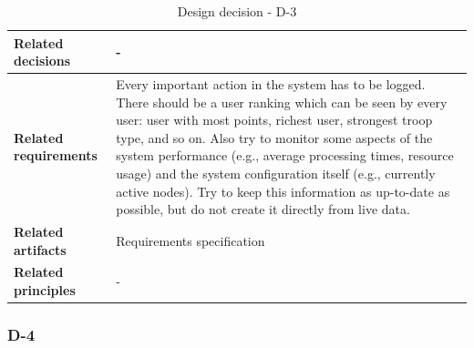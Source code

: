 \documentclass[11pt]{article}
\begin{document}
\begin{table}[h]
\begin{tabularx}{\textwidth}{ | l | X |}
	\hline
	\cellcolor[gray]{0.9}
	\textbf{Related decisions} & - \\ 
	\hline
	\cellcolor[gray]{0.9}
	\textbf{Related requirements} & Every important action in the system has to be logged. There should be a user ranking which can be seen by every user: user with most points, richest user, strongest troop type, and so on. Also try to monitor some aspects of the system performance (e.g., average processing times, resource usage) and the system configuration itself (e.g., currently active nodes). Try to keep this information as up-to-date as possible, but do not create it directly from live data.\\
	\hline
	\cellcolor[gray]{0.9}
	\textbf{Related artifacts} & Requirements specification\\
	\hline
	\cellcolor[gray]{0.9}
	\textbf{Related principles} & -\\
	\hline
	\end{tabularx}
	\caption{Design decision - D-3}
	\label{dec:D3}
\end{table}

\newpage

\subsubsection{D-4}
\end{document}
